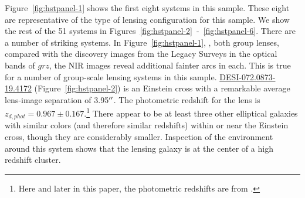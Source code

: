 {Figure~\ref{fig:hstpanel-1} shows the first eight systems in this sample.
These eight are representative of the type of lensing configuration for this \hst sample.
We show the rest of the 51 systems in Figures~\ref{fig:hstpanel-2}~-~\ref{fig:hstpanel-6}. 
There are a number of striking systems.
In Figure~\ref{fig:hstpanel-1}, 
, 
both group lenses, 
compared with the discovery images from the Legacy Surveys in the optical bands of $grz$,
the \hst NIR images reveal additional fainter arcs in each. 
This is true for a number of group-scale lensing systems in this sample.
\href{https://www.legacysurvey.org/viewer/?ra=72.0873&dec=-19.4174&layer=ls-dr9&pixscale=0.262&zoom=16}{DESI-072.0873-19.4172} (Figure~\ref{fig:hstpanel-2}) is an Einstein cross with a remarkable average lens-image separation of 3.95$^{\prime \prime}$.
The photometric redshift for the lens is $z_{d, phot} = 0.967\pm0.167$.\footnote{Here and later in this paper, 
the photometric redshifts are from \citet{zhou2020a}.} 
There appear to be at least three other elliptical galaxies with similar colors (and therefore similar redshifts) within or near the Einstein cross, 
though they are considerably smaller. 
Inspection of the environment around this system shows that the lensing galaxy is at the center of a high redshift cluster.
}
